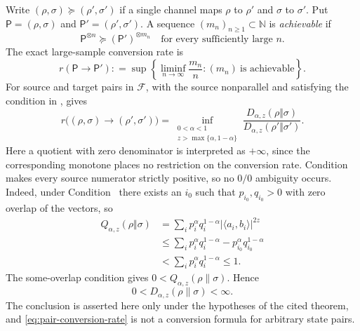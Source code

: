 \documentclass[12pt]{article}
\numberwithin{equation}{section}
\theoremstyle{definition}
\theoremstyle{remark}
\newcommand{\?}{\overset{?}{=}}
\newcommand{\defeq}{\mathrel{\mathop:}=}
\begin{document}
Write $(\rho,\sigma)\succeq(\rho',\sigma')$ if a single channel maps
$\rho$ to $\rho'$ and $\sigma$ to $\sigma'$.  Put
$\mathsf P=(\rho,\sigma)$ and $\mathsf P'=(\rho',\sigma')$.  A sequence
$(m_n)_{n\geq1}\subset\mathbb N$ is \emph{achievable} if
\begin{equation}
  \mathsf P^{\otimes n}\succeq(\mathsf P')^{\otimes m_n}
  \quad\text{for every sufficiently large }n.
  \label{eq:achievable-pair-conversion-sequence}
\end{equation}
The exact large-sample conversion rate is
\begin{equation}
  r(\mathsf P\to\mathsf P')
  \defeq \sup\left\{
  \liminf_{n\to\infty}\frac{m_n}{n}:
  (m_n)\ \text{is achievable}\right\}.
  \label{eq:exact-large-sample-rate-definition}
\end{equation}
For source and target pairs in $\mathcal F$, with the source nonparallel
and satisfying the condition in \cite[eq.~(14)]{Verhagen:2025anx}, 
\cite[Theorem~5]{Verhagen:2025anx} gives
\begin{equation}
  r\bigl((\rho,\sigma)\to(\rho',\sigma')\bigr)
  =\inf_{\substack{0<\alpha<1\\
                    z>\max\{\alpha,1-\alpha\}}}
  \frac{D_{\alpha,z}(\rho\Vert\sigma)}
       {D_{\alpha,z}(\rho'\Vert\sigma')}.
  \label{eq:pair-conversion-rate}
\end{equation}
Here a quotient with zero denominator is interpreted as $+\infty$, since
the corresponding monotone places no restriction on the conversion rate.
Condition~\cite[eq.~(14)]{Verhagen:2025anx} makes every source numerator strictly positive, so no
$0/0$ ambiguity occurs.  
Indeed, under Condition~\cite[eq.~(14)]{Verhagen:2025anx} there exists an $i_0$ such that $p_{i_0},q_{i_0}>0$ with zero overlap of the vectors, so
\[
\begin{aligned}
  Q_{\alpha,z}(\rho\Vert\sigma)
  &=
  \sum_i p_i^\alpha q_i^{1-\alpha}
  |\langle a_i,b_i\rangle|^{2z} \\
  &\leq
  \sum_i p_i^\alpha q_i^{1-\alpha}
  -p_{i_0}^\alpha q_{i_0}^{1-\alpha} \\
  &<
  \sum_i p_i^\alpha q_i^{1-\alpha}
  \leq 1.
\end{aligned}
\]
The some-overlap condition gives $0< Q_{\alpha,z}(\rho\|\sigma).$ 
Hence 
\begin{equation}
    0<D_{\alpha,z}(\rho\|\sigma)<\infty.
\end{equation}
The conclusion is asserted here only under the hypotheses of the cited
theorem, and \eqref{eq:pair-conversion-rate} is not a conversion formula for
arbitrary state pairs.
\end{document}
